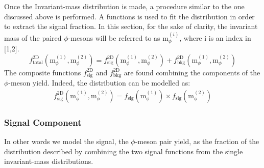 \indent Once the Invariant-mass distribution is made, a procedure similar to the one discussed above is performed. A functions is used to fit the distribution in order to extract the signal fraction. In this section, for the sake of clarity, the invariant mass of the paired $\phi$-mesons will be referred to as m$_{\phi}^{(i)}$, where i is an index in [1,2].\\
\begin{equation}
f^{\text{2D}}_{\text{total}}(\text{m}_{\phi}^{(1)},\text{m}_{\phi}^{(2)}) = f^{\text{2D}}_{\text{sig}}(\text{m}_{\phi}^{(1)},\text{m}_{\phi}^{(2)}) + f^{\text{2D}}_{\text{bkg}}(\text{m}_{\phi}^{(1)},\text{m}_{\phi}^{(2)}) 
\end{equation}
\indent The composite functions $ f^{\text{2D}}_{\text{sig}}$ and $ f^{\text{2D}}_{\text{bkg}}$ are found combining the components of the $\phi$-meson yield. Indeed, the distribution can be modelled as:
\begin{eqnarray}
 f^{\text{2D}}_{\text{sig}}(\text{m}_{\phi}^{(1)},\text{m}_{\phi}^{(2)}) =  f_{\text{sig}}(\text{m}_{\phi}^{(1)}) \times  f_{\text{sig}}(\text{m}_{\phi}^{(2)})
 \end{eqnarray}
\subsubsection{Signal Component} In other words we model the signal, the $\phi$-meson pair yield, as the fraction of the distribution described by combining the two signal functions from the single invariant-mass distributions.
